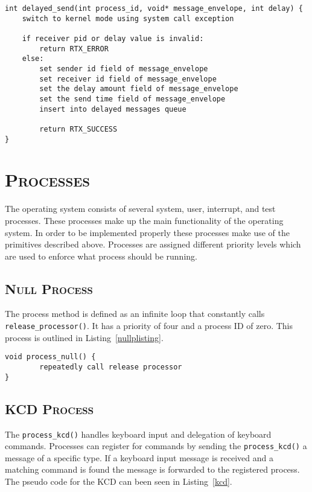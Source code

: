 \documentclass[oneside]{report}
\begin{document}
\begin{lstlisting}
int delayed_send(int process_id, void* message_envelope, int delay) {
    switch to kernel mode using system call exception

    if receiver pid or delay value is invalid:
        return RTX_ERROR
    else:
        set sender id field of message_envelope
        set receiver id field of message_envelope
        set the delay amount field of message_envelope
        set the send time field of message_envelope
        insert into delayed messages queue

        return RTX_SUCCESS
}
\end{lstlisting}


\pagebreak 

\section{\textsc{Processes}}
\label{sec:processes}
The operating system consists of several system, user, interrupt, and test 
processes. These processes make up the main functionality of the operating 
system. In order to be implemented properly these processes make use of the 
primitives described above. Processes are assigned different priority levels 
which are used to enforce what process should be running.
\subsection{\textsc{Null Process}}
The process method is defined as an infinite loop that constantly calls 
\texttt{release\_processor()}. It has a priority of four and a process ID of 
zero. This process is outlined in Listing~\ref{nullplisting}.

\begin{lstlisting}
void process_null() {
        repeatedly call release processor
}
\end{lstlisting}

\subsection{\textsc{KCD Process}}
The \texttt{process\_kcd()} handles keyboard input and delegation of keyboard 
commands. Processes can register for commands by sending the 
\texttt{process\_kcd()} a message of a specific type. If a keyboard input 
message is received and a matching command is found the message is forwarded to 
the registered process. The pseudo code for the KCD can been seen in 
Listing~\ref{kcd}.
\end{document}
